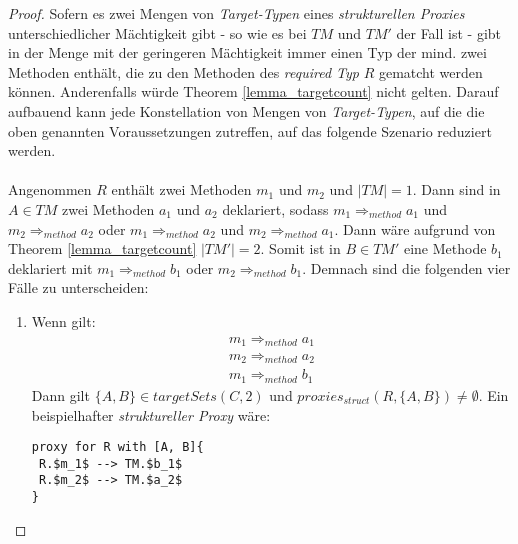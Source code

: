 \begin{proof}
Sofern es zwei Mengen von \emph{Target-Typen} eines \emph{strukturellen Proxies} unterschiedlicher Mächtigkeit gibt - so wie es bei $\mathit{TM}$ und $\mathit{TM'}$ der Fall ist - gibt in der Menge mit der geringeren Mächtigkeit immer einen Typ der mind. zwei Methoden enthält, die zu den Methoden des \emph{required Typ} $R$ gematcht werden können. Anderenfalls würde Theorem \ref{lemma_targetcount} nicht gelten.
Darauf aufbauend kann jede Konstellation von Mengen von \emph{Target-Typen}, auf die die oben genannten Voraussetzungen zutreffen, auf das folgende Szenario reduziert werden.
\\\\
Angenommen $R$ enthält zwei Methoden $m_1$ und $m_2$ und $|\mathit{TM}| = 1$.
Dann sind in $A \in \mathit{TM}$ zwei Methoden $a_1$ und $a_2$ deklariert, sodass $m_1 \Rightarrow_{method} a_1$ und $m_2 \Rightarrow_{method} a_2$ oder $m_1 \Rightarrow_{method} a_2$ und $m_2 \Rightarrow_{method} a_1$. Dann wäre aufgrund von Theorem \ref{lemma_targetcount} $|\mathit{TM'}| = 2$. Somit ist in $B \in \mathit{TM'}$ eine Methode $b_1$ deklariert mit $m_1 \Rightarrow_{method} b_1$ oder $m_2 \Rightarrow_{method} b_1$.
Demnach sind die folgenden vier Fälle zu unterscheiden:
\begin{enumerate}
\item 
Wenn gilt: 
\begin{gather*}
m_1 \Rightarrow_{method} a_1 \\
m_2 \Rightarrow_{method} a_2 \\
m_1 \Rightarrow_{method} b_1
\end{gather*}
Dann gilt $\{A, B\} \in \mathit{targetSets(C,2)}$ und $\mathit{proxies_{struct}(R,\{A, B\})} \neq \emptyset$.
Ein beispielhafter \emph{struktureller Proxy} wäre:
\begin{lstlisting}[mathescape, style=dsl]
proxy for R with [A, B]{
 R.$m_1$ --> TM.$b_1$
 R.$m_2$ --> TM.$a_2$
}
\end{lstlisting}


\end{enumerate}
\end{proof}
